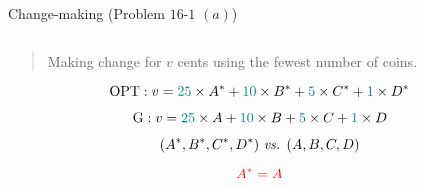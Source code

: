 
\begin{frame}{}
  \begin{exampleblock}{Change-making (Problem $16$-$1$ $(a)$)}
    \begin{columns}
    \end{columns}

    \vspace{0.30cm}
    \begin{quote}
      \centering
      {\large Making change for $v$ cents using the fewest number of coins.}
    \end{quote}
  \end{exampleblock}
\end{frame}

\begin{frame}{}
  \[
    \text{OPT}: v = \textcolor{teal}{25} \times A^{\ast} + \textcolor{teal}{10} \times B^{\ast} + \textcolor{teal}{5} \times C^{\ast} + \textcolor{teal}{1} \times D^{\ast}
  \]

  \pause
  \[
    \text{G}: v = \textcolor{teal}{25} \times A + \textcolor{teal}{10} \times B + \textcolor{teal}{5} \times C + \textcolor{teal}{1} \times D
  \]

  \pause
  \[
    (A^{\ast}, B^{\ast}, C^{\ast}, D^{\ast}) \text{ \it vs. } (A, B, C, D)
  \]

  \pause
  \vspace{0.30cm}
  \[
    \textcolor{red}{A^{\ast} = A}
  \]
\end{frame}

